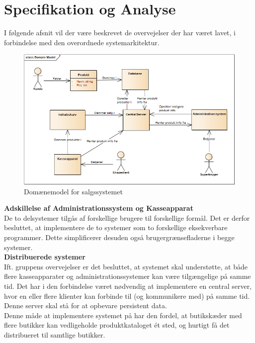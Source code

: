 \section{Specifikation og Analyse}

I følgende afsnit vil der være beskrevet de overvejelser der har været lavet, i forbindelse med den overordnede systemarkitektur.

\begin{figure}[H]
	\centering
	\includegraphics[width=1\textwidth]{Projektbeskrivelse/Images/DomainModel.png}
	\caption{Domænemodel for salgssystemet}
	\label{fig:domain}
\end{figure}


\textbf{Adskillelse af Administrationssystem og Kasseapparat}\\
De to delsystemer tilgås af forskellige brugere til forskellige formål. Det er derfor besluttet, at implementere de to systemer som to forskellige eksekverbare programmer. Dette simplificerer desuden også brugergrænsefladerne i begge systemer.\\

\textbf{Distribuerede systemer}\\
Ift. gruppens overvejelser er det besluttet, at systemet skal understøtte, at både flere kasseapparater og administrationssystemer kan være tilgængelige på samme tid. Det har i den forbindelse været nødvendig at implementere en central server, hvor en eller flere klienter kan forbinde til (og kommunikere med) på samme tid. Denne server skal stå for at opbevare persistent data.\\

Denne måde at implementere systemet på har den fordel, at butikskæder med flere butikker kan vedligeholde produktkataloget ét sted, og hurtigt få det distribueret til samtlige butikker.\\

